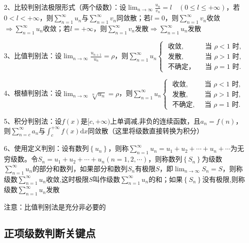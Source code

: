 2、比较判别法极限形式（两个级数）：设$ \lim_{n \rightarrow \infty} \frac{u_{n}}{v_{n}}=l \quad(0 \leqslant l \leqslant+\infty) $，若$ 0<l<+\infty $，则$ \sum_{n=1}^{\infty} u_{n} $与$ \sum_{n=1}^{\infty} v_{n} $同敛散；若$ l=0 $，则$ \sum_{n=1}^{\infty} v_{n} $收敛$ \Rightarrow \sum_{n=1}^{\infty} u_{n} $收敛；若$ l=+\infty $，则$ \sum_{n=1}^{\infty} v_{n} $发散$ \Rightarrow \sum_{n=1}^{\infty} u_{n} $发散

3、比值判别法：设$ \lim_{n \rightarrow \infty} \frac{u_{n+1}}{u_{n}}=\rho $，则$ \sum_{n=1}^{\infty} u_{n} \begin{cases}\text { 收敛, } & \text { 当 } \rho<1 \text { 时, } \\ \text { 发散, } & \text { 当 } \rho>1 \text { 时, } \\ \text { 不确定， } & \text { 当 } \rho=1 \text { 时. }\end{cases} $

4、根植判别法：设$ \lim_{n \rightarrow \infty} \sqrt[n]{u_{n}}=\rho $，则$ \sum_{n=1}^{\infty} u_{n} \begin{cases}\text { 收敛, } & \text { 当 } \rho<1 \text { 时, } \\ \text { 发散, } & \text { 当 } \rho>1 \text { 时, } \\ \text { 不确定, } & \text { 当 } \rho=1 \text { 时. }\end{cases} $

5、积分判别法：设$ f(x) $是$ [c,+\infty) $上单调减,非负的连续函数，且$ a_{n}=f(n) $，则$ \sum_{n=c}^{\infty} a_{n} $与$ \int_{c}^{+\infty} f(x) \mathrm{d} x $同敛散（这里将级数直接转换为积分）

6、使用定义判别：设有数列$ \left\{u_{n}\right\} $，则称$ \sum_{n=1}^{\infty} u_{n}=u_{1}+u_{2}+\cdots+u_{n}+\cdots $为无穷级数。令$ S_{n}=u_{1}+u_{2}+\cdots+u_{n}(n=1,2, \cdots) $，则称数列$ \left\{S_{n}\right\} $为级数$ \sum_{n=1}^{\infty} u_{n} $的部分和数列，如果部分和数列$  S_{n} $有极限$ S $，即$ \lim_{n \rightarrow \infty} S_{n}=S $，则称级数$ \sum_{n=1}^{\infty} u_{n} $收敛,这时极限$ S $叫作级数$ \sum_{n=1}^{\infty} u_{n} $的和；如果$ \left\{S_{n}\right\} $没有极限,则称级数$ \sum_{n=1}^{\infty} u_{n} $发散

注意：比值判别法是充分非必要的



\subsection{正项级数判断关键点}

